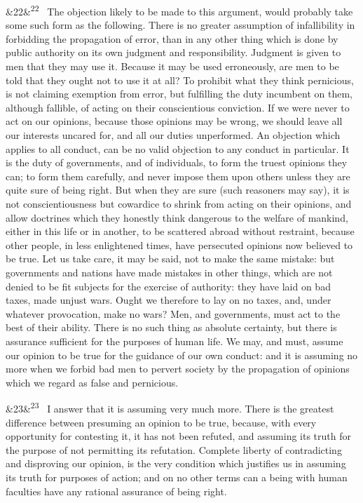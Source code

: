 \documentclass[12pt]{article}
\newcommand{\para}[1][]{\par\noindent\ifx&#1&\else\textsuperscript{\footnotesize #1}~\fi}
\begin{document}
\para[22] The objection likely to be made to this argument, would probably take some such form as the following. There is no greater assumption of infallibility in forbidding the propagation of error, than in any other thing which is done by public authority on its own judgment and responsibility. Judgment is given to men that they may use it. Because it may be used erroneously, are men to be told that they ought not to use it at all? To prohibit what they think pernicious, is not claiming exemption from error, but fulfilling the duty incumbent on them, although fallible, of acting on their conscientious conviction. If we were never to act on our opinions, because those opinions may be wrong, we should leave all our interests uncared for, and all our duties unperformed. An objection which applies to all conduct, can be no valid objection to any conduct in particular. It is the duty of governments, and of individuals, to form the truest opinions they can; to form them carefully, and never impose them upon others unless they are quite sure of being right. But when they are sure (such reasoners may say), it is not conscientiousness but cowardice to shrink from acting on their opinions, and allow doctrines which they honestly think dangerous to the welfare of mankind, either in this life or in another, to be scattered abroad without restraint, because other people, in less enlightened times, have persecuted opinions now believed to be true. Let us take care, it may be said, not to make the same mistake: but governments and nations have made mistakes in other things, which are not denied to be fit subjects for the exercise of authority: they have laid on bad taxes, made unjust wars. Ought we therefore to lay on no taxes, and, under whatever provocation, make no wars? Men, and governments, must act to the best of their ability. There is no such thing as absolute certainty, but there is assurance sufficient for the purposes of human life. We may, and must, assume our opinion to be true for the guidance of our own conduct: and it is assuming no more when we forbid bad men to pervert society by the propagation of opinions which we regard as false and pernicious.

\para[23] I answer that it is assuming very much more. There is the greatest difference between presuming an opinion to be true, because, with every opportunity for contesting it, it has not been refuted, and assuming its truth for the purpose of not permitting its refutation. Complete liberty of contradicting and disproving our opinion, is the very condition which justifies us in assuming its truth for purposes of action; and on no other terms can a being with human faculties have any rational assurance of being right.
\end{document}
